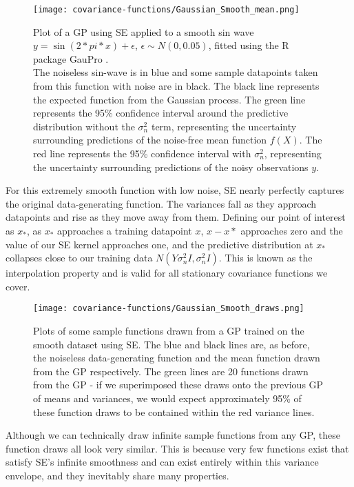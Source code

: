 \begin{figure}[H]
    \texttt{[image: covariance-functions/Gaussian\_Smooth\_mean.png]}
    \caption{
        Plot of a GP using SE applied to a smooth sin wave $y = \sin(2 * pi * x) + \epsilon$, $\epsilon \sim N(0, 0.05)$, fitted using the R package GauPro \cite{gaupro}. \\
        The noiseless sin-wave is in blue and some sample datapoints taken from this function with noise are in black. The black line represents the expected function from the Gaussian process. The green line represents the 95\% confidence interval around the predictive distribution without the $\sigma^2_n$ term, representing the uncertainty surrounding predictions of the noise-free mean function $f(X)$. The red line represents the 95\% confidence interval with $\sigma^2_n$, representing the uncertainty surrounding predictions of the noisy observations $y$.
    }
\end{figure}
For this extremely smooth function with low noise, SE nearly perfectly captures the original data-generating function. The variances fall as they approach datapoints and rise as they move away from them. Defining our point of interest as $x_*$, as $x_*$ approaches a training datapoint $x$, $x - x*$ approaches zero and the value of our SE kernel approaches one, and the predictive distribution at $x_*$ collapses close to our training data $N(Y \sigma_n^2I, \sigma_n^2I)$. This is known as the interpolation property \cite{gp-ml} and is valid for all stationary covariance functions we cover.

\begin{figure}[H]
    \texttt{[image: covariance-functions/Gaussian\_Smooth\_draws.png]}
    \caption{
        Plots of some sample functions drawn from a GP trained on the smooth dataset using SE. The blue and black lines are, as before, the noiseless data-generating function and the mean function drawn from the GP respectively. The green lines are 20 functions drawn from the GP - if we superimposed these draws onto the previous GP of means and variances, we would expect approximately 95\% of these function draws to be contained within the red variance lines. \\
            }
\end{figure}
Although we can technically draw infinite sample functions from any GP, these function draws all look very similar. This is because very few functions exist that satisfy SE's infinite smoothness and can exist entirely within this variance envelope, and they inevitably share many properties.

